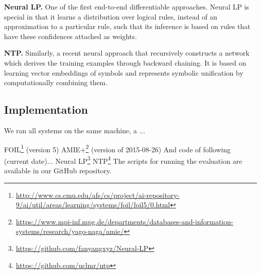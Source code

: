 \textbf{Neural LP.} \cite{YaYaCo-NIPS17:neurallp} One of the first end-to-end differentiable approaches. 
Neural LP is special in that it learns
a distribution over logical rules, instead of
an approximation to a particular rule, such that its inference is based on rules that have these confidences attached as weights.



\textbf{NTP.} \cite{RoR-NIPS17} Similarly, a recent neural approach that recursively constructs a network which derives the training examples through backward chaining.
It is based on learning vector embeddings of symbols and represents symbolic unification by computationally combining them.



\subsection{Implementation}
We ran all systems on the same machine, a ...

FOIL\footnote{\url{http://www.cs.cmu.edu/afs/cs/project/ai-repository-9/ai/util/areas/learning/systems/foil/foil5/0.html}} (version 5)
AMIE+\footnote{\url{https://www.mpi-inf.mpg.de/departments/databases-and-information-systems/research/yago-naga/amie/}} (version of 2015-08-26)
And code of following (current date)...
Neural LP\footnote{\url{https://github.com/fanyangxyz/Neural-LP}}
NTP\footnote{\url{https://github.com/uclmr/ntp}}
The scripts for running the evaluation are available in our GitHub repository.

